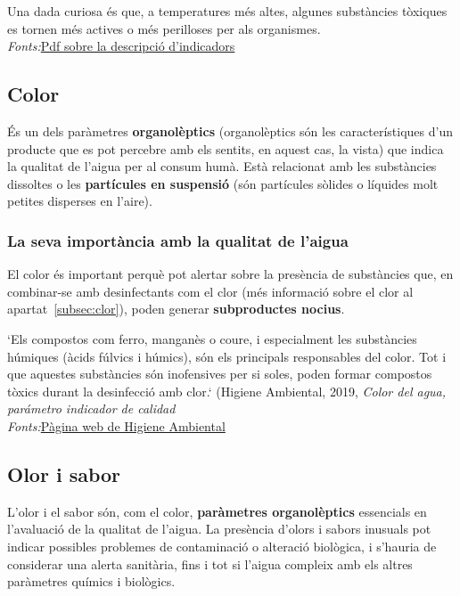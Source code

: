 Una dada curiosa és que, a temperatures més altes, algunes substàncies tòxiques es tornen més actives o més perilloses per als organismes.\\
\textit{Fonts:}\href{https://www.ucm.es/data/cont/docs/952-2015-02-14-Temperatura\%20f26.pdf}{Pdf sobre la descripció d'indicadors}\\

\subsection{Color} \label{subsec:color}
És un dels paràmetres \textbf{organolèptics} (organolèptics són les característiques d'un producte que es pot percebre amb els sentits, en aquest cas, la vista) que indica la qualitat de l'aigua per al consum humà. Està relacionat amb les substàncies dissoltes o les \textbf{partícules en suspensió} (són partícules sòlides o líquides molt petites disperses en l’aire).
\subsubsection{La seva importància amb la qualitat de l'aigua}
El color és important perquè pot alertar sobre la presència de substàncies que, en combinar-se amb desinfectants com el clor (més informació sobre el clor al apartat~\ref{subsec:clor}), poden generar \textbf{subproductes nocius}.

`Els compostos com ferro, manganès o coure, i especialment les substàncies húmiques (àcids fúlvics i húmics), són els principals responsables del color. Tot i que aquestes substàncies són inofensives per si soles, poden formar compostos tòxics durant la desinfecció amb clor.` (Higiene Ambiental, 2019, \textit{Color del agua, parámetro indicador de calidad}\\
 \textit{Fonts:}\href{https://higieneambiental.com/aire-agua-y-legionella/color-del-agua-parametro-indicador-de-calidad}{Pàgina web de Higiene Ambiental}

\subsection{Olor i sabor} \label{subsec:olorisabor}
L’olor i el sabor són, com el color, \textbf{paràmetres organolèptics} essencials en l’avaluació de la qualitat de l’aigua. La presència d’olors i sabors inusuals pot indicar possibles problemes de contaminació o alteració biològica, i s’hauria de considerar una alerta sanitària, fins i tot si l’aigua compleix amb els altres paràmetres químics i biològics.

